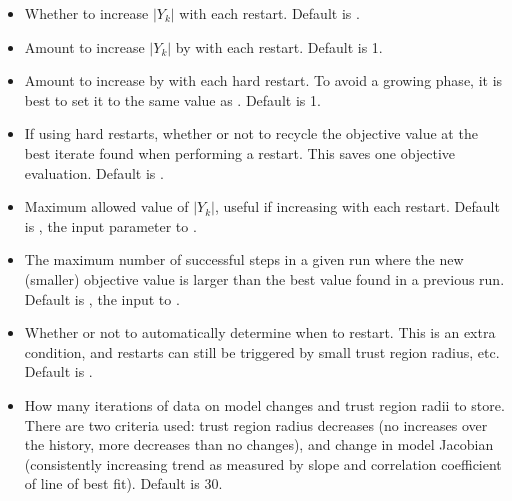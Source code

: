 \documentclass[letterpaper,10pt,english]{sphinxmanual}
\begin{document}
\begin{itemize}
\item {} 
\sphinxAtStartPar
{} \sphinxhyphen{} Whether to increase \(|Y_k|\) with each restart. Default is .

\item {} 
\sphinxAtStartPar
{} \sphinxhyphen{} Amount to increase \(|Y_k|\) by with each restart. Default is 1.

\item {} 
\sphinxAtStartPar
{} \sphinxhyphen{} Amount to increase  by with each hard restart. To avoid a growing phase, it is best to set it to the same value as . Default is 1.

\item {} 
\sphinxAtStartPar
{} \sphinxhyphen{} If using hard restarts, whether or not to recycle the objective value at the best iterate found when performing a restart. This saves one objective evaluation. Default is .

\item {} 
\sphinxAtStartPar
{} \sphinxhyphen{} Maximum allowed value of \(|Y_k|\), useful if increasing with each restart. Default is , the input parameter to .

\item {} 
\sphinxAtStartPar
{} \sphinxhyphen{} The maximum number of successful steps in a given run where the new (smaller) objective value is larger than the best value found in a previous run. Default is , the input to .

\item {} 
\sphinxAtStartPar
{} \sphinxhyphen{} Whether or not to automatically determine when to restart. This is an extra condition, and restarts can still be triggered by small trust region radius, etc. Default is .

\item {} 
\sphinxAtStartPar
{} \sphinxhyphen{} How many iterations of data on model changes and trust region radii to store. There are two criteria used: trust region radius decreases (no increases over the history, more decreases than no changes), and change in model Jacobian (consistently increasing trend as measured by slope and correlation coefficient of line of best fit). Default is 30.


\end{itemize}
\end{document}
